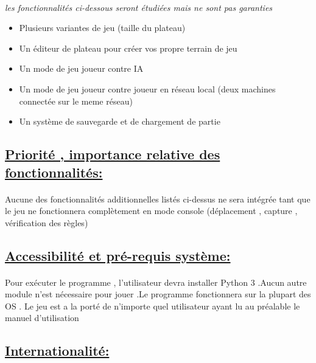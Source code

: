 \documentclass[a4paper,12pt]{article}
\begin{document}
\paragraph{}
\begin{center}
\emph{les fonctionnalités ci-dessous seront étudiées mais ne sont pas garanties }
\end{center}
\begin{itemize}
\item Plusieurs variantes de jeu (taille du plateau)
\item Un éditeur de plateau pour créer vos propre terrain de jeu
\item Un mode de jeu joueur contre IA
\item Un mode de jeu joueur contre joueur en réseau local (deux machines connectée sur le meme réseau)
\item Un système de sauvegarde et de chargement de partie
\end{itemize}


\subsection{\underline{Priorité , importance relative des fonctionnalités:}}
\paragraph{}
Aucune des fonctionnalités additionnelles listés ci-dessus ne sera intégrée tant que le jeu ne fonctionnera complètement en mode console (déplacement , capture , vérification des règles)

\subsection{\underline{Accessibilité et pré-requis système:}}
\paragraph{}
Pour exécuter le programme , l'utilisateur devra installer Python 3 .Aucun autre module n'est nécessaire pour jouer .Le programme fonctionnera sur la plupart des OS .
\newline
Le jeu est a la porté de n'importe quel utilisateur ayant lu au préalable le manuel d'utilisation


\subsection{\underline{Internationalité:}}
\end{document}
